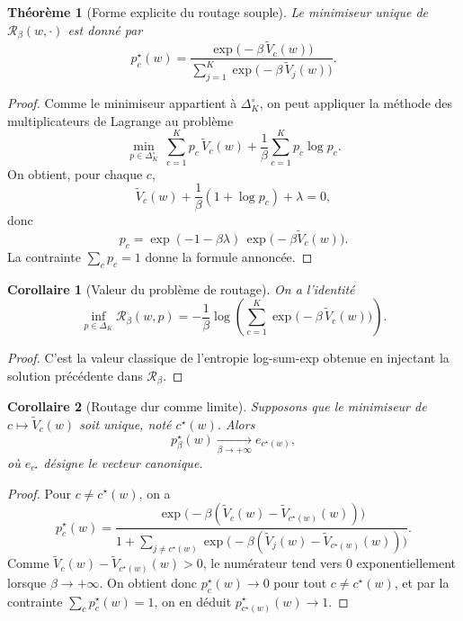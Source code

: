 \documentclass[11pt,a4paper]{article}
\newtheorem{theorem}{Théorème}[section]
\newtheorem{corollary}{Corollaire}[section]
\newcommand{\Rcal}{\mathcal R}
\begin{document}
\begin{theorem}[Forme explicite du routage souple]
Le minimiseur unique de \(\Rcal_\beta(w,\cdot)\) est donné par
\[
p_c^\star(w)
=
\frac{\exp\!\bigl(-\beta\,\widetilde V_c(w)\bigr)}
{\sum_{j=1}^K \exp\!\bigl(-\beta\,\widetilde V_j(w)\bigr)}.
\]
\end{theorem}

\begin{proof}
Comme le minimiseur appartient à \(\Delta_K^\circ\), on peut appliquer la méthode des multiplicateurs de Lagrange au problème
\[
\min_{p\in\Delta_K^\circ}\ \sum_{c=1}^K p_c\,\widetilde V_c(w)+\frac{1}{\beta}\sum_{c=1}^K p_c\log p_c.
\]
On obtient, pour chaque \(c\),
\[
\widetilde V_c(w)+\frac{1}{\beta}(1+\log p_c)+\lambda=0,
\]
donc
\[
p_c=\exp(-1-\beta\lambda)\,\exp\!\bigl(-\beta\widetilde V_c(w)\bigr).
\]
La contrainte \(\sum_c p_c=1\) donne la formule annoncée.
\end{proof}

\begin{corollary}[Valeur du problème de routage]
On a l'identité
\[
\inf_{p\in\Delta_K}\Rcal_\beta(w,p)
=
-\frac{1}{\beta}\log\!\left(\sum_{c=1}^K \exp\!\bigl(-\beta\,\widetilde V_c(w)\bigr)\right).
\]
\end{corollary}

\begin{proof}
C'est la valeur classique de l'entropie log-sum-exp obtenue en injectant la solution précédente dans \(\Rcal_\beta\).
\end{proof}

\begin{corollary}[Routage dur comme limite]
Supposons que le minimiseur de \(c\mapsto \widetilde V_c(w)\) soit unique, noté \(c^\star(w)\). Alors
\[
p^\star_\beta(w)\xrightarrow[\beta\to+\infty]{} e_{c^\star(w)},
\]
où \(e_{c^\star}\) désigne le vecteur canonique.
\end{corollary}

\begin{proof}
Pour \(c\neq c^\star(w)\), on a
\[
p_c^\star(w)
=
\frac{\exp\!\bigl(-\beta(\widetilde V_c(w)-\widetilde V_{c^\star(w)}(w))\bigr)}
{1+\sum_{j\neq c^\star(w)}\exp\!\bigl(-\beta(\widetilde V_j(w)-\widetilde V_{c^\star(w)}(w))\bigr)}.
\]
Comme \(\widetilde V_c(w)-\widetilde V_{c^\star(w)}(w)>0\), le numérateur tend vers \(0\) exponentiellement lorsque \(\beta\to+\infty\). On obtient donc \(p_c^\star(w)\to0\) pour tout \(c\neq c^\star(w)\), et par la contrainte \(\sum_c p_c^\star(w)=1\), on en déduit \(p_{c^\star(w)}^\star(w)\to1\).
\end{proof}
\end{document}

